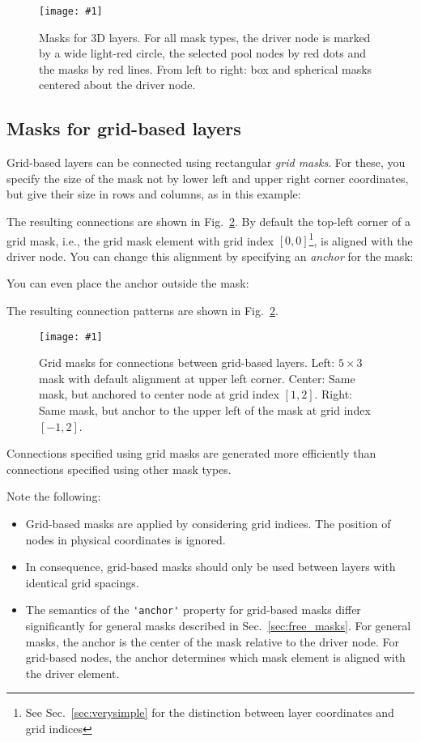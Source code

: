 \documentclass[a4paper,12pt]{report}
\newcommand{\scriptfig}[4]{%
\begin{figure}
\centerline{\texttt{[image: \#1]}}
\caption[#3]{#4}
\label{fig:#1}
\end{figure}%
}
\begin{document}
\scriptfig{conn_3d}{0.9}{Masks for 3D layers}%
{Masks for 3D layers. For all mask types, the driver node is
  marked by a wide light-red circle, the selected pool nodes by red
  dots and the masks by red lines. From left to right:
  box and spherical masks centered about the driver node.}


\subsection{Masks for grid-based layers}\label{sec:grid_masks}

Grid-based layers can be connected using rectangular \emph{grid
  masks}. For these, you specify the size of the mask
not by lower left and upper right corner coordinates, but give their
size in rows and columns, as in this example:
%

%
The resulting connections are shown in Fig.~\ref{fig:conn3}. By
default the top-left corner of a grid mask, i.e., the grid mask
element with grid index $[0,0]$\footnote{See Sec.~\ref{sec:verysimple} for the
distinction between layer coordinates and grid indices}, is aligned
with the driver node. You can change this alignment by specifying an
 \emph{anchor} for the mask:
%

%
You can even place the anchor outside the mask:
%

%
The resulting connection patterns are shown in Fig.~\ref{fig:conn3}.
%
\scriptfig{conn3}{0.9}{Grid masks}%
{Grid masks for connections between grid-based layers.
Left: $5\times3$ mask with default alignment at upper left corner.
Center: Same mask, but anchored to center node at grid index $[1,2]$.
Right: Same mask, but anchor to the upper left of the mask at grid
index $[-1,2]$.}
Connections specified using grid masks are generated more efficiently
than connections specified using other mask types.

Note the following:
\begin{itemize}
\item Grid-based masks are applied by considering grid indices. The
  position of nodes in physical coordinates is ignored.
\item In consequence, grid-based masks should only be used between
  layers with identical grid spacings.
\item The semantics of the \lstinline!'anchor'! property for
grid-based masks differ
significantly for general masks described in
Sec.~\ref{sec:free_masks}. For general masks, the anchor is the center
of the mask relative to the driver node. For grid-based nodes, the
anchor determines which mask element is aligned with the driver element.
\end{itemize}
\end{document}

